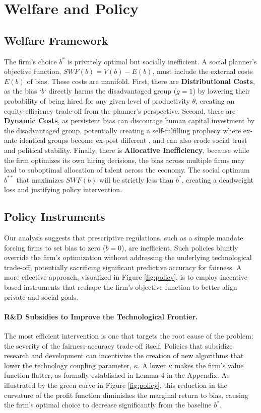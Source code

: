 \documentclass[12pt,a4paper]{article}
\theoremstyle{definition}
\theoremstyle{remark}
\begin{document}
\section{Welfare and Policy}

\subsection{Welfare Framework}
The firm's choice $b^*$ is privately optimal but socially inefficient. A social planner's objective function, $SWF(b) = V(b) - E(b)$, must include the external costs $E(b)$ of bias. These costs are manifold. First, there are \textbf{Distributional Costs}, as the bias `$b$` directly harms the disadvantaged group ($g=1$) by lowering their probability of being hired for any given level of productivity $\theta$, creating an equity-efficiency trade-off from the planner's perspective. Second, there are \textbf{Dynamic Costs}, as persistent bias can discourage human capital investment by the disadvantaged group, potentially creating a self-fulfilling prophecy where ex-ante identical groups become ex-post different \citep{Coate1993}, and can also erode social trust and political stability. Finally, there is \textbf{Allocative Inefficiency}, because while the firm optimizes its own hiring decisions, the bias across multiple firms may lead to suboptimal allocation of talent across the economy.
The social optimum $b^{**}$ that maximizes $SWF(b)$ will be strictly less than $b^*$, creating a deadweight loss and justifying policy intervention.

\subsection{Policy Instruments}

Our analysis suggests that prescriptive regulations, such as a simple mandate forcing firms to set bias to zero ($b=0$), are inefficient. Such policies bluntly override the firm's optimization without addressing the underlying technological trade-off, potentially sacrificing significant predictive accuracy for fairness. A more effective approach, visualized in Figure \ref{fig:policy}, is to employ incentive-based instruments that reshape the firm's objective function to better align private and social goals.

\paragraph{R\&D Subsidies to Improve the Technological Frontier.}
The most efficient intervention is one that targets the root cause of the problem: the severity of the fairness-accuracy trade-off itself. Policies that subsidize research and development can incentivize the creation of new algorithms that lower the technology coupling parameter, $\kappa$. A lower $\kappa$ makes the firm's value function flatter, as formally established in Lemma 4 in the Appendix. As illustrated by the green curve in Figure \ref{fig:policy}, this reduction in the curvature of the profit function diminishes the marginal return to bias, causing the firm's optimal choice to decrease significantly from the baseline $b^*$.
\end{document}

